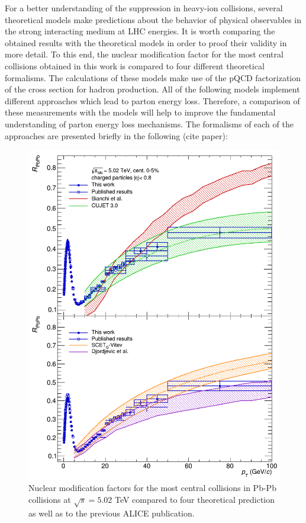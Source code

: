 \documentclass[12pt,a4paper]{report}
\begin{document}
For a better understanding of the suppression in heavy-ion collisions, several theoretical models make predictions about the behavior of physical observables in the strong interacting medium at LHC energies. It is worth comparing the obtained results with the theoretical models in order to proof their validity in more detail. To this end, the nuclear modification factor for the most central collisions obtained in this work is compared to four different theoretical formalisms. The calculations of these models make use of the pQCD factorization of the cross section for hadron production. All of the following models implement different approaches which lead to parton energy loss. Therefore, a comparison of these measurements with the models will help to improve the fundamental understanding of parton energy loss mechanisms. The formalisms of each of the approaches are presented briefly in the following (cite paper):
\begin{figure}[tb!]
\centering
\includegraphics[width=10	cm]{Plots/Raatheo.png}  
\caption{Nuclear modification factors for the most central collisions in Pb-Pb collisions at $\sqrt{s}=5.02$ TeV compared to four theoretical prediction as well as to the previous ALICE publication.}
\label{raatheo}
\end{figure}
\end{document}
